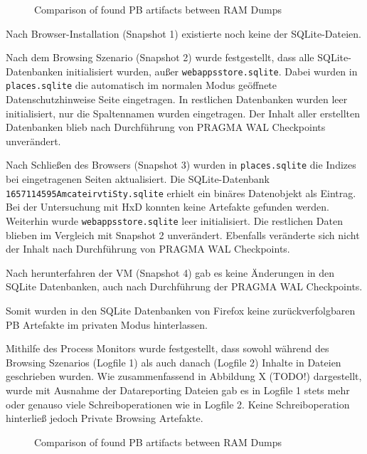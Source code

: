 \begin{figure}[h!]
	\centerline{}
	\label{chart:final-criteria}  
	\caption{Comparison of found PB artifacts between RAM Dumps}
\end{figure}
Nach Browser-Installation (Snapshot 1) existierte noch keine der SQLite-Dateien.

Nach dem Browsing Szenario (Snapshot 2) wurde festgestellt, dass alle SQLite-Datenbanken 
initialisiert wurden, außer \texttt{webappsstore.sqlite}. Dabei wurden in \texttt{places.sqlite} die automatisch im normalen Modus geöffnete Datenschutzhinweise Seite eingetragen. 
In restlichen Datenbanken wurden leer initialisiert, nur die Spaltennamen wurden eingetragen.
Der Inhalt aller erstellten Datenbanken blieb nach Durchführung von PRAGMA WAL Checkpoints unverändert.

Nach Schließen des Browsers (Snapshot 3) wurden in \texttt{places.sqlite} die Indizes bei eingetragenen Seiten aktualisiert. Die SQLite-Datenbank \texttt{1657114595AmcateirvtiSty.sqlite} erhielt ein binäres Datenobjekt als Eintrag. Bei der Untersuchung mit HxD konnten keine Artefakte gefunden werden. Weiterhin wurde \texttt{webappsstore.sqlite} leer initialisiert. Die restlichen Daten blieben im Vergleich mit Snapshot 2 unverändert. Ebenfalls veränderte sich nicht der Inhalt nach Durchführung von PRAGMA WAL Checkpoints.

Nach herunterfahren der VM (Snapshot 4) gab es keine Änderungen in den SQLite Datenbanken, auch nach Durchführung der PRAGMA WAL Checkpoints.
	
Somit wurden in den SQLite Datenbanken von Firefox keine zurückverfolgbaren PB Artefakte im privaten Modus hinterlassen.


Mithilfe des Process Monitors wurde festgestellt, dass sowohl während des Browsing Szenarios (Logfile 1) als auch danach (Logfile 2) Inhalte in Dateien geschrieben wurden. Wie zusammenfassend in Abbildung X (TODO!) dargestellt, wurde mit Ausnahme der Datareporting Dateien gab es in Logfile 1 stets mehr oder genauso viele Schreiboperationen wie in Logfile 2.
Keine Schreiboperation hinterließ jedoch Private Browsing Artefakte.
\begin{figure}[h!]
	\centerline{}
	\label{chart:final-criteria}  
	\caption{Comparison of found PB artifacts between RAM Dumps}
\end{figure}


